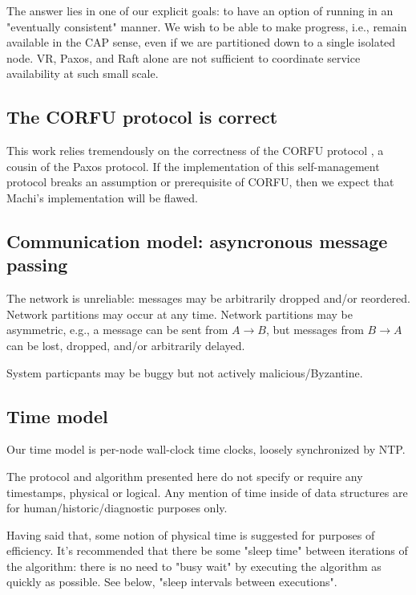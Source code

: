 \documentclass[preprint,10pt]{sigplanconf}
\begin{document}
The answer lies in one of our explicit goals: to have an option of
running in an "eventually consistent" manner.  We wish to be able to
make progress, i.e., remain available in the CAP sense, even if we are
partitioned down to a single isolated node.  VR, Paxos, and Raft
alone are not sufficient to coordinate service availability at such
small scale.

\subsection{The CORFU protocol is correct}

This work relies tremendously on the correctness of the CORFU
protocol \cite{corfu1}, a cousin of the Paxos protocol.
If the implementation of
this self-management protocol breaks an assumption or prerequisite of
CORFU, then we expect that Machi's implementation will be flawed.

\subsection{Communication model: asyncronous message passing}

The network is unreliable: messages may be arbitrarily dropped and/or
reordered.  Network partitions may occur at any time.
Network partitions may be asymmetric, e.g., a message can be sent
from $A \rightarrow B$, but messages from $B \rightarrow A$ can be
lost, dropped, and/or arbitrarily delayed.

System particpants may be buggy but not actively malicious/Byzantine.

\subsection{Time model}
\label{sub:time-model}

Our time model is per-node wall-clock time clocks, loosely
synchronized by NTP.

The protocol and algorithm presented here do not specify or require any
timestamps, physical or logical.  Any mention of time inside of data
structures are for human/historic/diagnostic purposes only.

Having said that, some notion of physical time is suggested for
purposes of efficiency.  It's recommended that there be some "sleep
time" between iterations of the algorithm: there is no need to "busy
wait" by executing the algorithm as quickly as possible.  See below,
"sleep intervals between executions".
\end{document}
